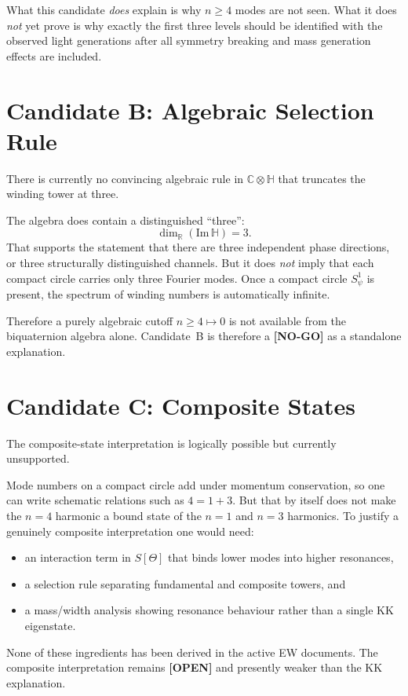 \documentclass[12pt,a4paper]{article}
\begin{document}
What this candidate \emph{does} explain is why \(n\ge 4\) modes are not seen.
What it does \emph{not} yet prove is why exactly the first three levels should be
identified with the observed light generations after all symmetry breaking and
mass generation effects are included.

\section{Candidate B: Algebraic Selection Rule}

There is currently no convincing algebraic rule in \(\mathbb{C}\otimes\mathbb{H}\)
that truncates the winding tower at three.

The algebra does contain a distinguished ``three'':
\[
\dim_{\mathbb{R}}(\mathrm{Im}\,\mathbb{H})=3.
\]
That supports the statement that there are three independent phase directions,
or three structurally distinguished channels.  But it does \emph{not} imply that
each compact circle carries only three Fourier modes.  Once a compact circle
\(S^1_\psi\) is present, the spectrum of winding numbers is automatically
infinite.

Therefore a purely algebraic cutoff \(n\ge 4\mapsto 0\) is not available from
the biquaternion algebra alone.  Candidate~B is therefore a \textbf{[NO-GO]} as
a standalone explanation.

\section{Candidate C: Composite States}

The composite-state interpretation is logically possible but currently
unsupported.

Mode numbers on a compact circle add under momentum conservation, so one can
write schematic relations such as \(4=1+3\).  But that by itself does not make
the \(n=4\) harmonic a bound state of the \(n=1\) and \(n=3\) harmonics.  To
justify a genuinely composite interpretation one would need:
\begin{itemize}
  \item an interaction term in \(S[\Theta]\) that binds lower modes into higher
  resonances,
  \item a selection rule separating fundamental and composite towers, and
  \item a mass/width analysis showing resonance behaviour rather than a single KK
  eigenstate.
\end{itemize}
None of these ingredients has been derived in the active EW documents.  The
composite interpretation remains \textbf{[OPEN]} and presently weaker than the
KK explanation.
\end{document}
